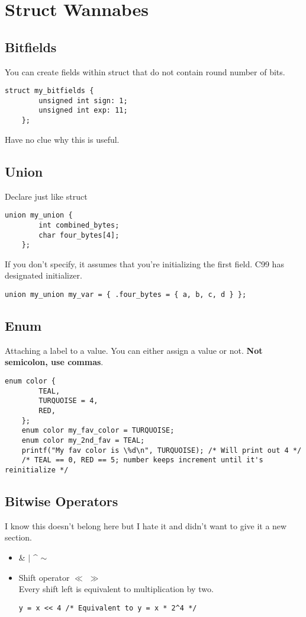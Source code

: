 \documentclass{article}
\begin{document}
\section{Struct Wannabes}

\subsection{Bitfields}
You can create fields within struct that do not contain round number of bits.
\begin{lstlisting}[style=CStyle]
    struct my_bitfields {
        unsigned int sign: 1;
        unsigned int exp: 11;
    };
\end{lstlisting}
Have no clue why this is useful.

\subsection{Union}
Declare just like struct
\begin{lstlisting}[style=CStyle]
    union my_union {
        int combined_bytes;
        char four_bytes[4];
    };
\end{lstlisting}
If you don't specify, it assumes that you're initializing the first field. C99 has designated initializer. 
\begin{lstlisting}[style=CStyle]
    union my_union my_var = { .four_bytes = { a, b, c, d } };
\end{lstlisting}

\subsection{Enum}
Attaching a label to a value. You can either assign a value or not. \textbf{Not semicolon, use commas}.
\begin{lstlisting}[style=CStyle]
    enum color {
        TEAL,
        TURQUOISE = 4,
        RED,
    };
    enum color my_fav_color = TURQUOISE;
    enum color my_2nd_fav = TEAL;
    printf("My fav color is \%d\n", TURQUOISE); /* Will print out 4 */
    /* TEAL == 0, RED == 5; number keeps increment until it's reinitialize */
\end{lstlisting}

\subsection{Bitwise Operators}
I know this doesn't belong here but I hate it and didn't want to give it a new section.
\begin{itemize}
    \item \& $\mid$ \^{} $\sim$
    \item Shift operator $\ll$ $\gg$\\
    Every shift left is equivalent to multiplication by two.
    \begin{lstlisting}[style=CStyle]
        y = x << 4 /* Equivalent to y = x * 2^4 */
    \end{lstlisting}
\end{itemize}
\end{document}
